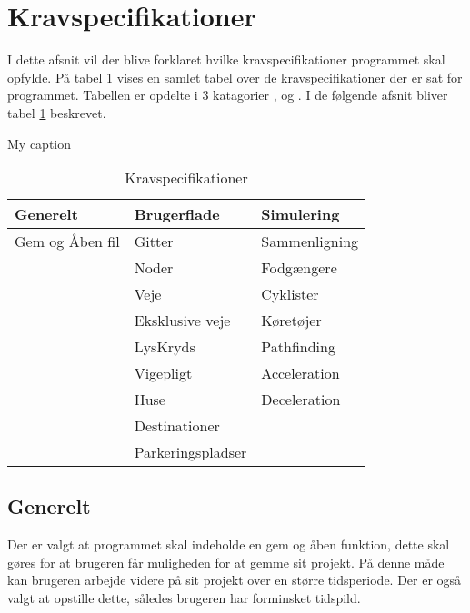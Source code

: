 
\section{Kravspecifikationer}
I dette afsnit vil der blive forklaret hvilke kravspecifikationer programmet skal opfylde. På tabel \ref{fig:KravspecifikationerTabel} vises en samlet tabel over de kravspecifikationer der er sat for programmet. Tabellen er opdelte i 3 katagorier ,  og . I de følgende afsnit bliver tabel \ref{fig:KravspecifikationerTabel} beskrevet.

\begin{table}[H]
\centering
\caption{My caption}
\label{my-label}
\begin{tabular}{|l|l|l|}
\hline
\textbf{Generelt} & \textbf{Brugerflade} & \textbf{Simulering} \\ \hline
Gem og Åben fil   & Gitter               & Sammenligning       \\ \hline
                  & Noder                & Fodgængere          \\ \hline
                  & Veje                 & Cyklister           \\ \hline
                  & Eksklusive veje      & Køretøjer           \\ \hline
                  & LysKryds             & Pathfinding         \\ \hline
                  & Vigepligt            & Acceleration        \\ \hline
                  & Huse                 & Deceleration        \\ \hline
                  & Destinationer        &                     \\ \hline
                  & Parkeringspladser    &                     \\ \hline
\end{tabular}
\caption{Kravspecifikationer}\label{fig:KravspecifikationerTabel}
\end{table}

\subsection{Generelt}
Der er valgt at programmet skal indeholde en gem og åben funktion, dette skal gøres for at brugeren får muligheden for at gemme sit projekt. På denne måde kan brugeren arbejde videre på sit projekt over en større tidsperiode. Der er også valgt at opstille dette, således brugeren har forminsket tidspild.

